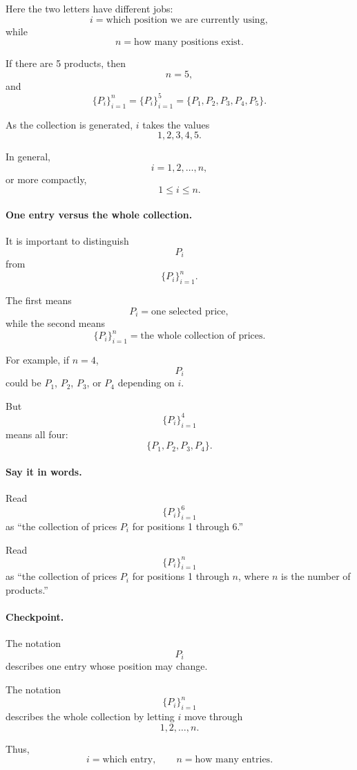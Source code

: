 	Here the two letters have different jobs:
	\[
	i=\text{which position we are currently using},
	\]
	while
	\[
	n=\text{how many positions exist}.
	\]
	
	If there are 5 products, then
	\[
	n=5,
	\]
	and
	\[
	\{P_i\}_{i=1}^{n}
	=
	\{P_i\}_{i=1}^{5}
	=
	\{P_1,P_2,P_3,P_4,P_5\}.
	\]
	
	As the collection is generated, $i$ takes the values
	\[
	1,2,3,4,5.
	\]
	
	In general,
	\[
	i=1,2,\ldots,n,
	\]
	or more compactly,
	\[
	1\leq i\leq n.
	\]
	
	\paragraph{One entry versus the whole collection.}
	
	It is important to distinguish
	\[
	P_i
	\]
	from
	\[
	\{P_i\}_{i=1}^{n}.
	\]
	
	The first means
	\[
	\boxed{P_i=\text{one selected price}},
	\]
	while the second means
	\[
	\boxed{\{P_i\}_{i=1}^{n}=\text{the whole collection of prices}}.
	\]
	
	For example, if $n=4$,
	\[
	P_i
	\]
	could be $P_1$, $P_2$, $P_3$, or $P_4$ depending on $i$.
	
	But
	\[
	\{P_i\}_{i=1}^{4}
	\]
	means all four:
	\[
	\{P_1,P_2,P_3,P_4\}.
	\]
	
	\paragraph{Say it in words.}
	
	Read
	\[
	\{P_i\}_{i=1}^{6}
	\]
	as ``the collection of prices $P_i$ for positions 1 through 6.''
	
	Read
	\[
	\{P_i\}_{i=1}^{n}
	\]
	as ``the collection of prices $P_i$ for positions 1 through $n$, where $n$ is the number of products.''
	
	\paragraph{Checkpoint.}
	
	The notation
	\[
	P_i
	\]
	describes one entry whose position may change.
	
	The notation
	\[
	\{P_i\}_{i=1}^{n}
	\]
	describes the whole collection by letting $i$ move through
	\[
	1,2,\ldots,n.
	\]
	
	Thus,
	\[
	i=\text{which entry},
	\qquad
	n=\text{how many entries}.
	\]
	
